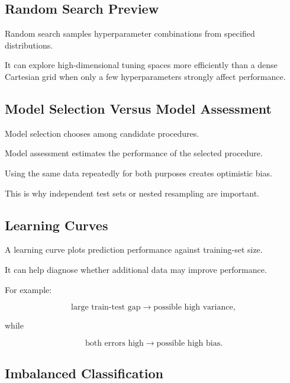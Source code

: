 \subsection{Random Search Preview}
\label{subsec:random-search}

Random search samples hyperparameter combinations from specified
distributions.

It can explore high-dimensional tuning spaces more efficiently than a
dense Cartesian grid when only a few hyperparameters strongly affect
performance.

\subsection{Model Selection Versus Model Assessment}
\label{subsec:model-selection-versus-assessment}

Model selection chooses among candidate procedures.

Model assessment estimates the performance of the selected procedure.

Using the same data repeatedly for both purposes creates optimistic bias.

This is why independent test sets or nested resampling are important.

\subsection{Learning Curves}
\label{subsec:learning-curves}

A learning curve plots prediction performance against training-set size.

It can help diagnose whether additional data may improve performance.

For example:

\[
\boxed{
\text{large train-test gap}
\rightarrow
\text{possible high variance},
}
\]

while

\[
\boxed{
\text{both errors high}
\rightarrow
\text{possible high bias}.
}
\]

\subsection{Imbalanced Classification}
\label{subsec:imbalanced-classification}

